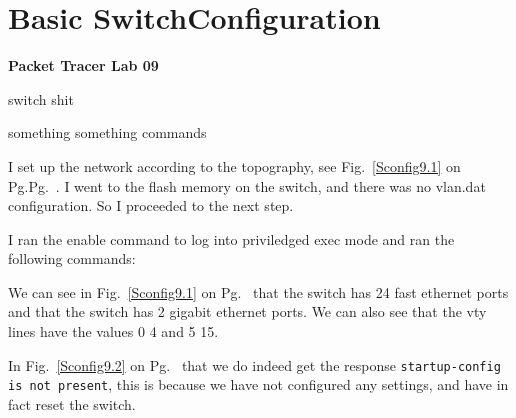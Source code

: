 \documentclass[../EngineeringJournal_CDavis.tex]{subfiles}
\begin{document}

\chapter[Basic Switch Configuration]{Basic Switch\linebreak[1]
Configuration \hspace*{\fill February 21, 2020}}
\noindent\textbf{{Packet Tracer Lab 09} }                             


\hspace{0.2cm}
\begin{tcolorbox}[width=6.3in]
\scriptsize 
switch shit
  \begin{outline}
    \1 something something commands
  \end{outline}
\end{tcolorbox}
\hspace{0.2cm}
\normalsize  

\clearpage


I set up the network according to the topography, see
Fig.~\ref{Sconfig9.1} on Pg.Pg.~\pageref{Sconfig9.1}. I went to the flash memory
on the switch, and there was no vlan.dat configuration. So I proceeded to the
next step. 
\hfill\break

\noindent{}

I ran the enable command to log into priviledged
exec mode and ran the following commands:
\hfill\break

We can see in Fig.~\ref{Sconfig9.1} on
Pg.~\pageref{Sconfig9.1} that the switch has 24 fast ethernet ports
and that the switch has 2 gigabit ethernet ports. We can also see that the
vty lines have the values 0 4 and 5 15.
\hfill\break

In Fig.~\ref{Sconfig9.2} on Pg.~\pageref{Sconfig9.2}
that we do indeed get the 
response {\scriptsize{\verb$startup-config is not present$}\normalsize}, 
this is because we have not configured any settings, and
have in fact reset the switch.
\hfill\break
\end{document}
